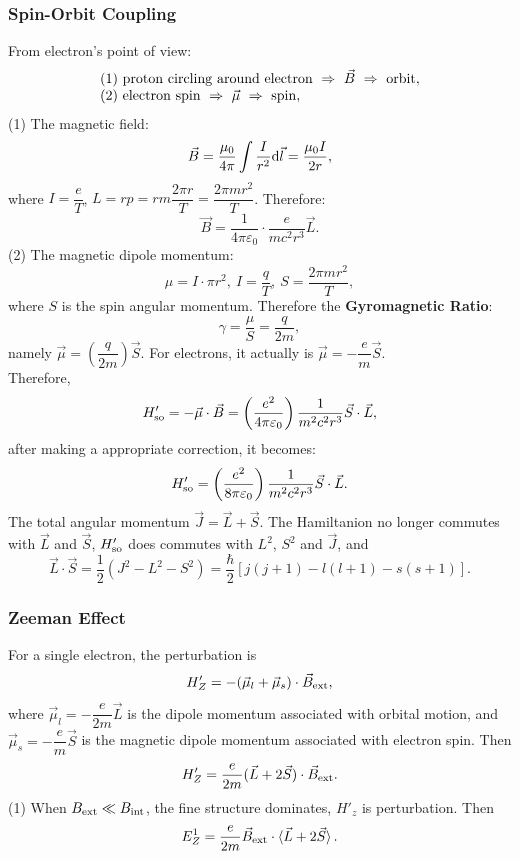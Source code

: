 \documentclass[12pt, 
]{article}
\begin{document}
\subsubsection{Spin-Orbit Coupling}
From electron's point of view:
\[
	\begin{array}{l}
		(1)~{\rm proton~circling~around~electron}~\Rightarrow~\vec{B}~\Rightarrow~{\rm orbit},\\
		(2)~{\rm electron~spin}~\Rightarrow~\vec{\mu}~\Rightarrow~{\rm spin},
	\end{array}
\]
(1) The magnetic field:
\[
	\vec{B}=\frac{\mu_0}{4\pi}\int\frac{I}{r^2}{\rm d}\vec{l}=\frac{\mu_0I}{2r},
\]
where $I=\dfrac{e}{T}$, $L=rp=rm\dfrac{2\pi r}{T}=\dfrac{2\pi m r^2}{T}$. Therefore:
\[
	\vec{B}=\frac{1}{4\pi\varepsilon_0}\cdot\frac{e}{mc^2r^3}\vec{L}.
\]
(2) The magnetic dipole momentum:
\[
	\mu=I\cdot\pi r^2, ~I=\frac{q}{T},~S=\frac{2\pi m r^2}{T},
\]
where $S$ is the spin angular momentum. Therefore the {\bf Gyromagnetic Ratio}:
\[
	\gamma=\frac{\mu}{S}=\frac{q}{2m},
\]
namely $\vec{\mu}=\left(\dfrac{q}{2m}\right)\vec{S}$. For electrons, it actually is $\vec{\mu}=-\dfrac{e}{m}\vec{S}$.\\
Therefore,
\begin{eqnarray*}
	H'_{\rm so}=-\vec{\mu}\cdot\vec{B}=\left(\frac{e^2}{4\pi\varepsilon_0}\right)\frac{1}{m^2c^2r^3}\vec{S}\cdot\vec{L},
\end{eqnarray*}
after making a appropriate correction, it becomes:
\[
	H'_{\rm so}=\left(\frac{e^2}{8\pi\varepsilon_0}\right)\frac{1}{m^2c^2r^3}\vec{S}\cdot\vec{L}.
\]
The total angular momentum $\vec{J}=\vec{L}+\vec{S}$. The Hamiltanion no longer commutes with $\vec{L}$ and $\vec{S}$, $H'_{\rm so}$ does commutes with $L^2$, $S^2$ and $\vec{J}$, and 
\[
	\vec{L}\cdot\vec{S}=\frac{1}{2}(J^2-L^2-S^2)=\frac{\hbar}{2}[j(j+1)-l(l+1)-s(s+1)].
\]

\subsubsection{Zeeman Effect}
For a single electron, the perturbation is \[
	H'_Z=-(\vec{\mu}_l+\vec{\mu}_s)\cdot\vec{B}_{\rm ext},
\]
where $\vec{\mu}_l=-\dfrac{e}{2m}\vec{L}$ is the dipole momentum associated with orbital motion, and $\vec{\mu}_s=-\dfrac{e}{m}\vec{S}$ is the magnetic dipole momentum associated with electron spin. Then
\[	
	H'_Z=\frac{e}{2m}(\vec{L}+2\vec{S})\cdot\vec{B}_{\rm ext}.
\]
(1) When $B_{\rm ext}\ll B_{\rm int}$, the fine structure dominates, $H'_z$ is perturbation. Then
\[
	E_Z^1=\frac{e}{2m}\vec{B}_{\rm ext}\cdot\braket{\vec{L}+2\vec{S}}.
\]
\end{document}
